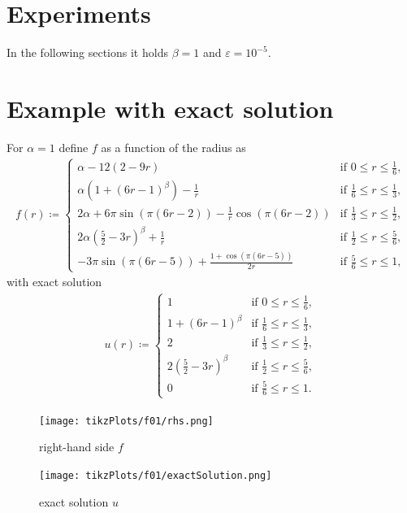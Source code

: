 \documentclass[draft=false,twoside,12pt]{scrreprt}
\begin{document}
\section{Experiments}
In the following sections it holds $\beta = 1$ and $\varepsilon=10^{-5}$.
\section{Example with exact solution}
For $\alpha = 1$ define $f$ as a function of the radius as
\begin{align}
  \label{equ:f01}
  f(r)\coloneqq 
  \begin{cases}
    \alpha-12(2-9r) & \text{if } 0\leq r\leq\frac{1}{6},\\
    \alpha(1+(6r-1)^\beta)-\frac{1}{r} & \text{if } \frac{1}{6}\leq r\leq
    \frac{1}{3},\\
    2\alpha+6\pi\sin(\pi(6r-2))-\frac{1}{r}\cos(\pi(6r-2)) &
    \text{if } \frac{1}{3}\leq r\leq\frac{1}{2},\\
    2\alpha(\frac{5}{2}-3r)^\beta+\frac{1}{r}&
    \text{if } \frac{1}{2}\leq r\leq\frac{5}{6},\\
    -3\pi\sin(\pi(6r-5))+\frac{1+\cos(\pi(6r-5))}{2r} &
    \text{if } \frac{5}{6}\leq r\leq 1,
  \end{cases}
\end{align}
with exact solution
\begin{align}
  \label{equ:f01exactSol}
  u(r)\coloneqq
  \begin{cases}
    1 & \text{if } 0\leq r\leq\frac{1}{6},\\
    1+(6r-1)^\beta & \text{if } \frac{1}{6}\leq r\leq
    \frac{1}{3},\\
    2 &
    \text{if } \frac{1}{3}\leq r\leq\frac{1}{2},\\
    2(\frac{5}{2}-3r)^\beta &
    \text{if } \frac{1}{2}\leq r\leq\frac{5}{6},\\
    0 &
    \text{if } \frac{5}{6}\leq r\leq 1.
  \end{cases}
\end{align}

\begin{minipage}[t]{0.45\textwidth}
  \begin{figure}[H]
	  \centering
		\texttt{[image: tikzPlots/f01/rhs.png]} 
		\caption{right-hand side $f$}
  \end{figure}
\end{minipage}
\begin{minipage}[t]{0.45\textwidth}
  \begin{figure}[H]
	  \centering
		\texttt{[image: tikzPlots/f01/exactSolution.png]} 
		\caption{exact solution $u$}
  \end{figure}
\end{minipage}
\end{document}
